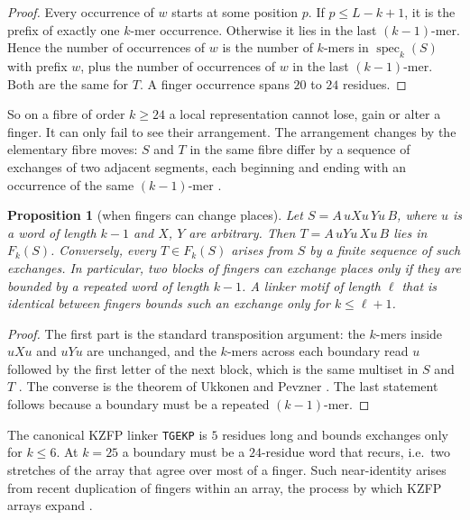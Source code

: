 \documentclass[11pt]{article}
\theoremstyle{plain}
\newtheorem{proposition}[theorem]{Proposition}
\theoremstyle{definition}
\theoremstyle{remark}
\newcommand{\spec}{\operatorname{spec}}
\begin{document}
\begin{proof}
Every occurrence of $w$ starts at some position $p$. If $p\le L-k+1$, it is the prefix of exactly one $k$-mer
occurrence. Otherwise it lies in the last $(k-1)$-mer. Hence the number of occurrences of $w$ is the number of
$k$-mers in $\spec_k(S)$ with prefix $w$, plus the number of occurrences of $w$ in the last $(k-1)$-mer. Both are
the same for $T$. A finger occurrence spans $20$ to $24$ residues.
\end{proof}

So on a fibre of order $k\ge24$ a local representation cannot lose, gain or alter a finger. It can only fail to
see their arrangement. The arrangement changes by the elementary fibre moves: $S$ and $T$ in the same fibre differ
by a sequence of exchanges of two adjacent segments, each beginning and ending with an occurrence of the same
$(k-1)$-mer \cite{Ukk92,Pev95}.

\begin{proposition}[when fingers can change places]\label{prop:swap}
Let $S=A\,uXu\,Yu\,B$, where $u$ is a word of length $k-1$ and $X$, $Y$ are arbitrary. Then $T=A\,uYu\,Xu\,B$ lies in $F_k(S)$.
Conversely, every $T\in F_k(S)$ arises from $S$ by a finite sequence of such exchanges. In particular, two blocks of
fingers can exchange places only if they are bounded by a repeated word of length $k-1$. A linker motif of length
$\ell$ that is identical between fingers bounds such an exchange only for $k\le\ell+1$.
\end{proposition}

\begin{proof}
The first part is the standard transposition argument: the $k$-mers inside $uXu$ and $uYu$ are unchanged, and
the $k$-mers across each boundary read $u$ followed by the first letter of the next block, which is the same
multiset in $S$ and $T$ \cite{Ukk92}. The converse is the theorem of Ukkonen and Pevzner \cite{Ukk92,Pev95}. The
last statement follows because a boundary must be a repeated $(k-1)$-mer.
\end{proof}

The canonical KZFP linker \texttt{TGEKP} is $5$ residues long and bounds exchanges only for $k\le6$. At $k=25$ a
boundary must be a $24$-residue word that recurs, i.e.\ two stretches of the array that agree over most of a
finger. Such near-identity arises from recent duplication of fingers within an array, the process by which KZFP
arrays expand \cite{Imbeault17}.
\end{document}
